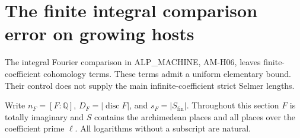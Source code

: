 \section{The finite integral comparison error on growing hosts}
\label{sec:finite-gluing-budget}

The integral Fourier comparison in ALP\_MACHINE, AM-H06,
leaves finite-coefficient cohomology terms.  These terms admit
a uniform elementary bound.  Their control does not supply
the main infinite-coefficient strict Selmer lengths.

Write $n_F=[F:\mathbb Q]$, $D_F=|\operatorname{disc}F|$,
and $s_F=|S_{\mathrm{fin}}|$.  Throughout this section $F$
is totally imaginary and $S$ contains the archimedean places
and all places over the coefficient prime $\ell$.
All logarithms without a subscript are natural.

